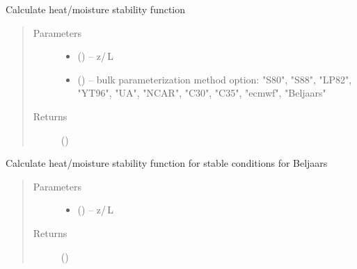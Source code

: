 \documentclass[letterpaper,10pt,english]{sphinxmanual}
\begin{document}
\begin{fulllineitems}
\label{\detokenize{index:flux_subs.psit_calc}}
Calculate heat/moisture stability function
\begin{quote}\begin{description}
\item[{Parameters}] \leavevmode\begin{itemize}
\item {} 
 (\href{https://docs.python.org/3/library/functions.html\#float}{}) -- z\slash\,L

\item {} 
 (\href{https://docs.python.org/3/library/stdtypes.html\#str}{}) -- bulk parameterization method option: "S80", "S88", "LP82", "YT96", "UA", "NCAR", "C30", "C35", "ecmwf", "Beljaars"

\end{itemize}

\item[{Returns}] \leavevmode
{} (\href{https://docs.python.org/3/library/functions.html\#float}{})

\end{description}\end{quote}

\end{fulllineitems}


\begin{fulllineitems}
\label{\detokenize{index:flux_subs.psi_Bel}}
Calculate heat/moisture stability function for stable conditions for Beljaars \citep{Beljaars1991}
\begin{quote}\begin{description}
\item[{Parameters}] \leavevmode\begin{itemize}
\item {} 
 (\href{https://docs.python.org/3/library/functions.html\#float}{}) -- z\slash\,L

\end{itemize}

\item[{Returns}] \leavevmode
{} (\href{https://docs.python.org/3/library/functions.html\#float}{})

\end{description}\end{quote}

\end{fulllineitems}
\end{document}
